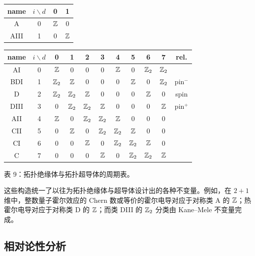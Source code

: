 \begin{center}
\footnotesize
\setlength{\tabcolsep}{3.4pt}
\begin{tabular}[t]{c||c|cc}
\toprule
name & $i\backslash d$ & 0 & 1\\
\midrule
A & 0 & $\mathbb{Z}$ & 0\\
AIII & 1 & 0 & $\mathbb{Z}$\\
\bottomrule
\end{tabular}
\hspace{10pt}
\begin{tabular}[t]{c||c|cccccccc|c}
\toprule
name & $i\backslash d$ & 0 & 1 & 2 & 3 & 4 & 5 & 6 & 7 & rel.\\
\midrule
AI   & 0 & $\mathbb{Z}$  & 0    & 0    & 0    & $\mathbb{Z}$ & 0    & $\mathbb{Z}_2$ & $\mathbb{Z}_2$ & \\
BDI  & 1 & $\mathbb{Z}_2$& $\mathbb{Z}$ & 0    & 0    & 0    & $\mathbb{Z}$ & 0      & $\mathbb{Z}_2$ & pin$^-$\\
D    & 2 & $\mathbb{Z}_2$& $\mathbb{Z}_2$& $\mathbb{Z}$ & 0    & 0    & 0    & $\mathbb{Z}$   & 0      & spin\\
DIII & 3 & 0    & $\mathbb{Z}_2$& $\mathbb{Z}_2$& $\mathbb{Z}$ & 0    & 0    & 0      & $\mathbb{Z}$   & pin$^+$\\
AII  & 4 & $\mathbb{Z}$  & 0    & $\mathbb{Z}_2$& $\mathbb{Z}_2$& $\mathbb{Z}$ & 0    & 0      & 0      & \\
CII  & 5 & 0    & $\mathbb{Z}$ & 0    & $\mathbb{Z}_2$& $\mathbb{Z}_2$& $\mathbb{Z}$ & 0      & 0      & \\
CI   & 6 & 0    & 0    & $\mathbb{Z}$ & 0    & $\mathbb{Z}_2$& $\mathbb{Z}_2$& $\mathbb{Z}$  & 0      & \\
C    & 7 & 0    & 0    & 0    & $\mathbb{Z}$ & 0    & $\mathbb{Z}_2$& $\mathbb{Z}_2$ & $\mathbb{Z}$  & \\
\bottomrule
\end{tabular}

\smallskip
{\small 表 9：拓扑绝缘体与拓扑超导体的周期表。}
\end{center}

这些构造统一了以往为拓扑绝缘体与超导体设计出的各种不变量。例如，在 $2+1$ 维中，整数量子霍尔效应的 Chern 数或等价的霍尔电导对应于对称类 A 的 $\mathbb{Z}$；热霍尔电导对应于对称类 D 的 $\mathbb{Z}$；而类 DIII 的 $\mathbb{Z}_2$ 分类由 Kane--Mele 不变量完成。

\subsection{相对论性分析}

